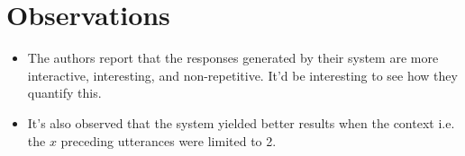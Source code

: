 \documentclass[12pt]{scrartcl}
\begin{document}
\section{Observations}
  \begin{itemize}
    \item The authors report that the responses generated by their system are more interactive, interesting, and
    non-repetitive. It'd be interesting to see how they quantify this.
    \item It's also observed that the system yielded better results when the context i.e. the $x$ preceding utterances were limited to 2.
  \end{itemize}



\end{document}
